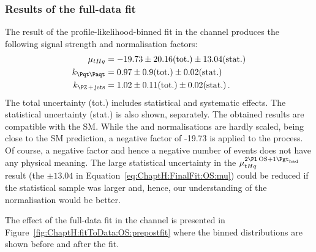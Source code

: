 \subsubsection{Results of the \dilepOStau full-data fit}
\label{sec:ChaptH:Fit:FullFit:OS:results}
The result of the profile-likelihood-binned fit in the \dilepOStau channel 
produces the following signal strength and normalisation factors:
\begin{align}
	\mu_{\tHq}	&= -19.73 \pm 20.16 (\text{tot.}) \pm 13.04 (\text{stat.})	\label{eq:ChaptH:FinalFit:OS:mu} \\
	k_{\ttbar}		&= 0.97 \pm 0.9 (\text{tot.}) \pm 0.02 (\text{stat.}) 		\label{eq:ChaptH:FinalFit:OS:ktt}\\
	k_{\Zjets}		&= 1.02 \pm 0.11 (\text{tot.}) \pm 0.02 (\text{stat.})  		\label{eq:ChaptH:FinalFit:OS:zjets}\, .
\end{align}
The total uncertainty (tot.) includes statistical and systematic effects.
The statistical uncertainty (stat.) is also shown, separately.
The obtained results are compatible with the SM. While the 
\ttbar and \Zjets normalisations are hardly scaled, being close to the SM prediction,
a negative factor of -19.73 is applied to the \tHq process. Of course, a negative factor and hence a negative
number of events does not have any physical meaning.
The large statistical uncertainty in the $\mu^{\dilepOStau}_{\tHq}$ result (the $\pm 13.04$ in Equation~\ref{eq:ChaptH:FinalFit:OS:mu})
could be reduced if the statistical sample was larger and, hence, our understanding
of the \tHq normalisation would be better. 

The effect of the full-data fit in the \dilepOS channel is presented in Figure~\ref{fig:ChaptH:fitToData:OS:prepostfit} where the 
binned distributions are shown before and after the fit. 

